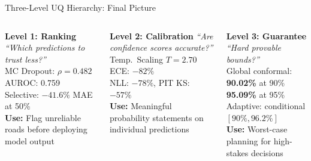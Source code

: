 \documentclass[aspectratio=169,10pt]{beamer}
\newcommand{\emphblue}[1]{\textcolor{tumblue}{\textbf{#1}}}
\begin{document}
\begin{frame}{Three-Level UQ Hierarchy: Final Picture}
  \begin{columns}[c]
      \begin{block}{\emphblue{Level 1: Ranking}}
        \textit{``Which predictions to trust less?''}\\[0.5em]
        MC Dropout: $\rho = 0.482$\\
        AUROC: 0.759\\
        Selective: $-41.6\%$ MAE at 50\%\\[0.5em]
        \textbf{Use:} Flag unreliable roads before deploying model output
      \end{block}
      \begin{block}{\emphblue{Level 2: Calibration}}
        \textit{``Are confidence scores accurate?''}\\[0.5em]
        Temp.\ Scaling $T = 2.70$\\
        ECE: $-82\%$\\
        NLL: $-78\%$, PIT KS: $-57\%$\\[0.5em]
        \textbf{Use:} Meaningful probability statements on individual predictions
      \end{block}
      \begin{block}{\emphblue{Level 3: Guarantee}}
        \textit{``Hard provable bounds?''}\\[0.5em]
        Global conformal:\\
        \emphblue{90.02\%} at 90\%\\
        \emphblue{95.09\%} at 95\%\\
        Adaptive: conditional $[90\%, 96.2\%]$\\[0.5em]
        \textbf{Use:} Worst-case planning for high-stakes decisions
      \end{block}
  \end{columns}
  \vspace{0.6em}
  \centering
\end{frame}
\end{document}
